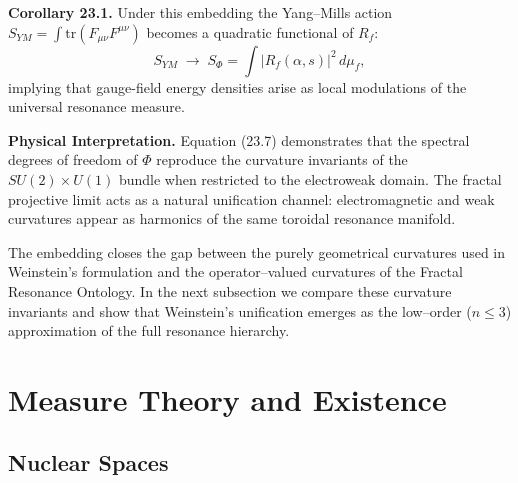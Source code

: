 \vspace{0.5em}
\noindent\textbf{Corollary 23.1.}
Under this embedding the Yang--Mills action
\(
S_{YM}=\int \mathrm{tr}(F_{\mu\nu}F^{\mu\nu})
\)
becomes a quadratic functional of $R_f$:
\[
S_{YM}
\;\longrightarrow\;
S_{\Phi}
=\int |R_f(\alpha,s)|^{2}\,d\mu_f,
\]
implying that gauge-field energy densities
arise as local modulations of the universal resonance measure.

\vspace{0.5em}
\noindent\textbf{Physical Interpretation.}
Equation (23.7) demonstrates that the spectral degrees of freedom
of $\Phi$ reproduce the curvature invariants of
the $SU(2)\times U(1)$ bundle when restricted to the electroweak
domain.
The fractal projective limit acts as a natural unification channel:
electromagnetic and weak curvatures appear as harmonics of the same
toroidal resonance manifold.

%

The embedding closes the gap between the purely geometrical
curvatures used in Weinstein's formulation and the operator--valued
curvatures of the Fractal Resonance Ontology.
In the next subsection we compare these curvature invariants and
show that Weinstein's unification emerges as the low--order
($n\!\leq\!3$) approximation of the full resonance hierarchy.

\section{Measure Theory and Existence}

\subsection{Nuclear Spaces}

